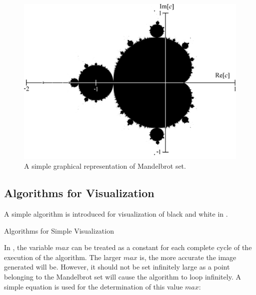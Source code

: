 \begin{figure}[th]
\centering
\includegraphics[width=\textwidth,keepaspectratio]{Figures/Chapter2/mandelbrot.png}
\decoRule
\caption[Mandelbrot Set Graphical Presentation]{A simple graphical representation of Mandelbrot set.}
\label{fig:mandelbrot}
\end{figure}

\subsection*{Algorithms for Visualization}\label{chap2:algorithmsforvisualization}

A simple algorithm is introduced for visualization of black and white in .

\begin{algorithm}[H]
    \caption{Algorithms for Simple Visualization}
    \label{alg:simple}
\end{algorithm}

In , the variable $max$ can be treated as a constant for each complete cycle of the execution of the algorithm. The larger $max$ is, the more accurate the image generated will be. However, it should not be set infinitely large as a point belonging to the Mandelbrot set will cause the algorithm to loop infinitely. A simple equation is used for the determination of this value $max$:

